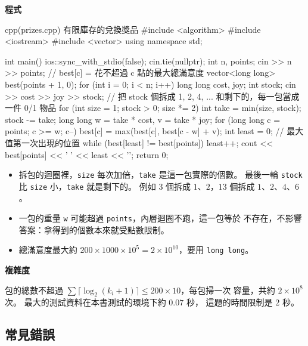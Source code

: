 \textbf{程式}

\begin{example}[label=ex:prizes]{cpp}{(prizes.cpp) 有限庫存的兌換獎品}
#include <algorithm>
#include <iostream>
#include <vector>
using namespace std;

int main() {
    ios::sync_with_stdio(false);
    cin.tie(nullptr);
    int n, points;
    cin >> n >> points;
    // best[c] = 花不超過 c 點的最大總滿意度
    vector<long long> best(points + 1, 0);
    for (int i = 0; i < n; i++) {
        long long cost, joy;
        int stock;
        cin >> cost >> joy >> stock;
        // 把 stock 個拆成 1, 2, 4, ... 和剩下的，每一包當成一件 0/1 物品
        for (int size = 1; stock > 0; size *= 2) {
            int take = min(size, stock);
            stock -= take;
            long long w = take * cost, v = take * joy;
            for (long long c = points; c >= w; c--) {
                best[c] = max(best[c], best[c - w] + v);
            }
        }
    }
    int least = 0;                          // 最大值第一次出現的位置
    while (best[least] != best[points]) {
        least++;
    }
    cout << best[points] << ' ' << least << '\n';
    return 0;
}
\end{example}


\begin{itemize}
\item 拆包的迴圈裡，\texttt{size} 每次加倍，\texttt{take} 是這一包實際的個數。
最後一輪 \texttt{stock} 比 \texttt{size} 小，\texttt{take} 就是剩下的。 例如
$3$ 個拆成 $1$、$2$，$13$ 個拆成 $1$、$2$、$4$、$6$。
\item 一包的重量 \texttt{w} 可能超過 \texttt{points}，內層迴圈不跑，這一包等於
不存在，不影響答案：拿得到的個數本來就受點數限制。
\item 總滿意度最大約 $200 \times 1000 \times 10^5 = 2 \times 10^{10}$，要用
\texttt{long long}。
\end{itemize}

\textbf{複雜度}

包的總數不超過 $\sum \lceil \log_2(k_i + 1) \rceil \le 200 \times 10$，每包掃一次
容量，共約 $2 \times 10^8$ 次。 最大的測試資料在本書測試的環境下約 $0.07$ 秒，
這題的時間限制是 $2$ 秒。

\subsection{常見錯誤}

